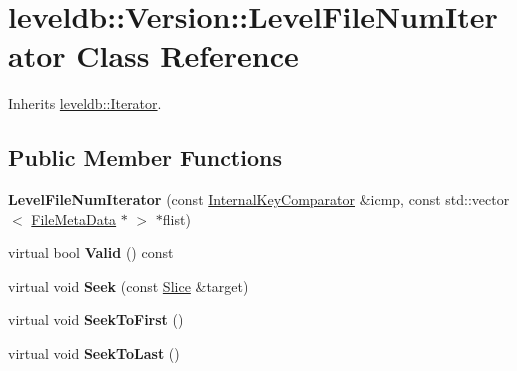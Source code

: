 \hypertarget{classleveldb_1_1_version_1_1_level_file_num_iterator}{}\section{leveldb\+::Version\+::Level\+File\+Num\+Iterator Class Reference}
\label{classleveldb_1_1_version_1_1_level_file_num_iterator}


Inherits \mbox{\hyperlink{classleveldb_1_1_iterator}{leveldb\+::\+Iterator}}.

\subsection*{Public Member Functions}
\begin{DoxyCompactItemize}
\item 
\mbox{\label{classleveldb_1_1_version_1_1_level_file_num_iterator_a7d9b5b7c74d74974ae322d20535f112a}} 
{\bfseries Level\+File\+Num\+Iterator} (const \mbox{\hyperlink{classleveldb_1_1_internal_key_comparator}{Internal\+Key\+Comparator}} \&icmp, const std\+::vector$<$ \mbox{\hyperlink{structleveldb_1_1_file_meta_data}{File\+Meta\+Data}} $\ast$ $>$ $\ast$flist)
\item 
\mbox{\label{classleveldb_1_1_version_1_1_level_file_num_iterator_a9bf0e045961ed325d37bfaa8b2c77e8b}} 
virtual bool {\bfseries Valid} () const
\item 
\mbox{\label{classleveldb_1_1_version_1_1_level_file_num_iterator_adbe855f4a783c2f578e1ff2fbb5259b2}} 
virtual void {\bfseries Seek} (const \mbox{\hyperlink{classleveldb_1_1_slice}{Slice}} \&target)
\item 
\mbox{\label{classleveldb_1_1_version_1_1_level_file_num_iterator_a8e5d34bf0c1e17e83bbb9941821a7ee2}} 
virtual void {\bfseries Seek\+To\+First} ()
\item 
\mbox{\label{classleveldb_1_1_version_1_1_level_file_num_iterator_ac7fafc33c049d1e33fdf9b5ae99f73d8}} 
virtual void {\bfseries Seek\+To\+Last} ()

\end{DoxyCompactItemize}
